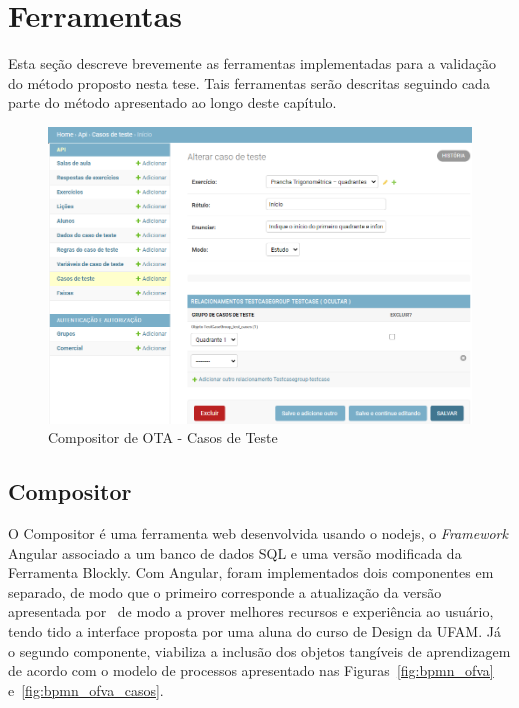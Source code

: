 \section{Ferramentas}\label{section:Tools}

Esta seção descreve brevemente as ferramentas implementadas para a validação do método proposto nesta tese. Tais ferramentas serão descritas seguindo cada parte do método apresentado ao longo deste capítulo.

 \begin{figure}[htb]
	\centering
	\includegraphics[width=0.95\linewidth]{chapters/proposedMethod/tools/composer_ota}
	\caption{Compositor de OTA - Casos de Teste}
	\label{fig:composer_ofva_testcase}
\end{figure}

\subsection{Compositor}


O Compositor é uma ferramenta web desenvolvida usando o nodejs, o \textit{Framework} Angular associado a um banco de dados SQL e uma versão modificada da Ferramenta Blockly. Com Angular, foram implementados dois componentes em separado, de modo que o primeiro corresponde a atualização da versão apresentada por~\cite{leitao:2017} de modo a prover melhores recursos e experiência ao usuário, tendo tido a interface proposta por uma aluna do curso de Design da UFAM. Já o segundo componente, viabiliza a inclusão dos objetos tangíveis de aprendizagem de acordo com o modelo de processos apresentado nas Figuras~\ref{fig:bpmn_ofva} e~\ref{fig:bpmn_ofva_casos}.

